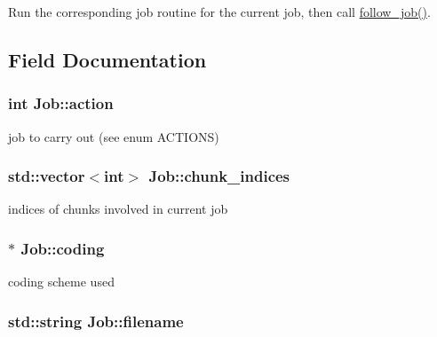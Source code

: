 \-Run the corresponding job routine for the current job, then call \hyperlink{classJob_a9f3dfcff17ca8458dfda34d0845a95ef}{follow\-\_\-job()}. 



\subsection{\-Field \-Documentation}
\hypertarget{classJob_a5ac6c3e826332838d56cfb647b894179}{
\subsubsection[{action}]{\setlength{\rightskip}{0pt plus 5cm}int {\bf \-Job\-::action}}}\label{classJob_a5ac6c3e826332838d56cfb647b894179}


job to carry out (see enum \-A\-C\-T\-I\-O\-N\-S) 

\hypertarget{classJob_a27b098f0eb47ccf65e011cea1f738277}{
\subsubsection[{chunk\-\_\-indices}]{\setlength{\rightskip}{0pt plus 5cm}std\-::vector$<$int$>$ {\bf \-Job\-::chunk\-\_\-indices}}}\label{classJob_a27b098f0eb47ccf65e011cea1f738277}


indices of chunks involved in current job 

\hypertarget{classJob_ad78a9a8f3f37b373f0b9212e50e47161}{
\subsubsection[{coding}]{$\ast$ {\bf \-Job\-::coding}}}\label{classJob_ad78a9a8f3f37b373f0b9212e50e47161}


coding scheme used 

\hypertarget{classJob_a7611809399acfa1a39f824ff0ad04c21}{
\subsubsection[{filename}]{\setlength{\rightskip}{0pt plus 5cm}std\-::string {\bf \-Job\-::filename}}}\label{classJob_a7611809399acfa1a39f824ff0ad04c21}


